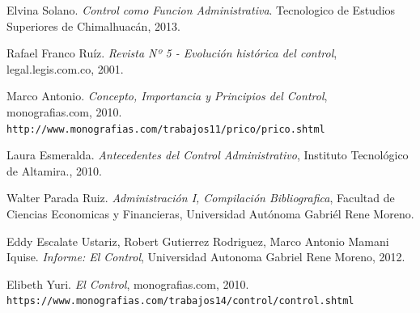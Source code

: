 \documentclass[12pt,letterpaper]{article}
\begin{document}
\newpage


\begin{thebibliography}{9}
Elvina Solano.
\textit{Control como Funcion Administrativa}. 
Tecnologico de Estudios Superiores de Chimalhuacán, 2013.
 
Rafael Franco Ruíz. \textit{Revista Nº 5 - Evolución histórica del control}, legal.legis.com.co, 2001.

 
Marco Antonio. \textit{Concepto, Importancia y Principios del Control}, monografias.com, 2010.
\\\texttt{http://www.monografias.com/trabajos11/prico/prico.shtml}

Laura Esmeralda. \textit{Antecedentes del Control  Administrativo}, Instituto Tecnológico de Altamira., 2010.

Walter Parada Ruiz. \textit{Administración I, Compilación Bibliografica}, Facultad de Ciencias Economicas y Financieras, Universidad Autónoma Gabriél Rene Moreno.

Eddy Escalate Ustariz, Robert Gutierrez Rodriguez, Marco Antonio Mamani Iquise. \textit{Informe: El Control}, Universidad Autonoma Gabriel Rene Moreno, 2012.

Elibeth Yuri. \textit{El Control}, monografias.com, 2010.
\\\texttt{https://www.monografias.com/trabajos14/control/control.shtml}
\end{thebibliography}
\end{document}
